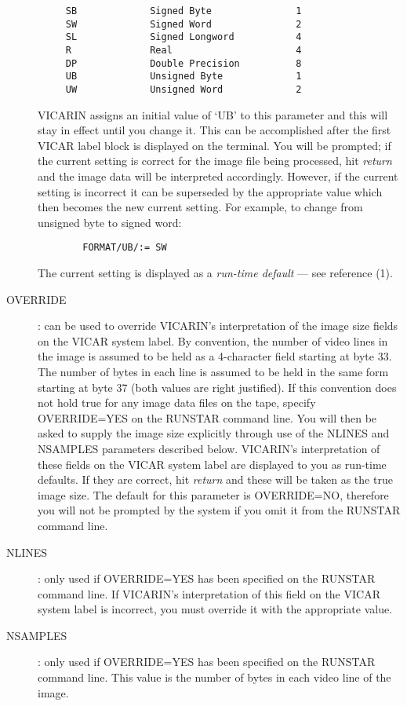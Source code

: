 \begin{description}
\begin{verbatim}
     SB             Signed Byte               1
     SW             Signed Word               2
     SL             Signed Longword           4
     R              Real                      4
     DP             Double Precision          8
     UB             Unsigned Byte             1
     UW             Unsigned Word             2
\end{verbatim}
VICARIN assigns an initial value of `UB' to this parameter and this will stay in
effect until you change it.
This can be accomplished after the first VICAR label block is displayed on the
terminal.
You will be prompted; if the current setting is correct for the image file
being processed, hit {\em return} and the image data will be interpreted
accordingly.
However, if the current setting is incorrect it can be superseded by the
appropriate value which then becomes the new current  setting.
For example, to change from unsigned byte to signed word:
\begin{verbatim}
        FORMAT/UB/:= SW
\end{verbatim}
The current setting is displayed as a {\em run-time default} --- see reference
(1).
\item[OVERRIDE]:
can be used to override VICARIN's interpretation of the image size
fields on the VICAR system label.
By convention, the number of video lines in the image is assumed to be held as
a 4-character field starting at byte 33.
The number of bytes in each line is assumed to be held in the same form starting
at byte 37 (both values are right justified).
If this convention does not hold true for any image data files on the tape,
specify OVERRIDE=YES on the RUNSTAR command line.
You will then be asked to supply the image size explicitly through use of the
NLINES and NSAMPLES parameters described below.
VICARIN's interpretation of these fields on the VICAR system label are displayed
to you as run-time defaults.
If they are correct, hit {\em return} and these will be taken as the true
image size.
The default for this parameter is  OVERRIDE=NO, therefore you will not be
prompted by the system if you omit it from the RUNSTAR command line.
\item[NLINES]:
only used if OVERRIDE=YES has been specified on the RUNSTAR command line.
If VICARIN's interpretation of this field on the VICAR system label is
incorrect, you must override it with the appropriate value.
\item[NSAMPLES]:
only used if OVERRIDE=YES has been specified on the RUNSTAR command line.
This value is the number of bytes in each video line of the image.
\end{description}
